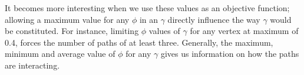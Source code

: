 It becomes more interesting when we use these values as an objective function; allowing a maximum value for any \(\phi\) in an \(\gamma\) directly influence the way \(\gamma\) would be constituted. For instance, limiting \(\phi\) values of \(\gamma\) for any vertex at maximum of 0.4, forces the number of paths of at least three. Generally, the maximum, minimum and average value of \(\phi\) for any \(\gamma\) gives us information on how the paths are interacting. 







